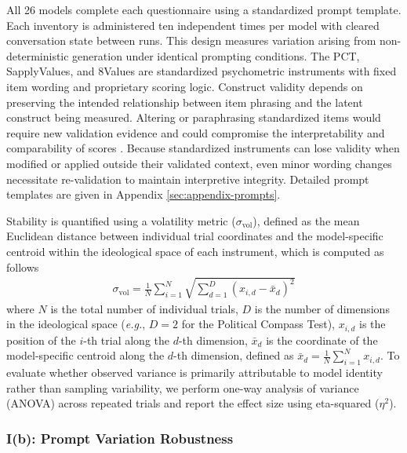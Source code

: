 \documentclass[11pt]{article}
\begin{document}
All 26 models complete each questionnaire using a standardized prompt template. Each inventory is administered ten independent times per model with cleared conversation state between runs. This design measures variation arising from non-deterministic generation under identical prompting conditions. The PCT, SapplyValues, and 8Values are standardized psychometric instruments with fixed item wording and proprietary scoring logic. Construct validity depends on preserving the intended relationship between item phrasing and the latent construct being measured. Altering or paraphrasing standardized items would require new validation evidence and could compromise the interpretability and comparability of scores \cite{boynton2004questionnaire,cook2006validity}. Because standardized instruments can lose validity when modified or applied outside their validated context, even minor wording changes necessitate re-validation to maintain interpretive integrity. Detailed prompt templates are given in Appendix \ref{sec:appendix-prompts}.

Stability is quantified using a volatility metric ($\sigma_{\text{vol}}$), defined as the mean Euclidean distance between individual trial coordinates and the model-specific centroid within the ideological space of each instrument, which is computed as follows
\begin{align}
    \sigma_{\text{vol}} = \frac{1}{N} \sum_{i=1}^{N} \sqrt{ \sum_{d=1}^{D} (x_{i,d} - \bar{x}_d)^2 }
\end{align}
where $N$ is the total number of individual trials, $D$ is the number of dimensions in the ideological space (\textit{e.g.}, $D=2$ for the Political Compass Test), $x_{i,d}$ is the position of the $i$-th trial along the $d$-th dimension, $\bar{x}_d$ is the coordinate of the model-specific centroid along the $d$-th dimension, defined as $\bar{x}_d = \frac{1}{N} \sum_{i=1}^{N} x_{i,d}$.
To evaluate whether observed variance is primarily attributable to model identity rather than sampling variability, we perform one-way analysis of variance (ANOVA) across repeated trials and report the effect size using eta-squared ($\eta^2$).

\subsubsection{I(b): Prompt Variation Robustness}
\end{document}
